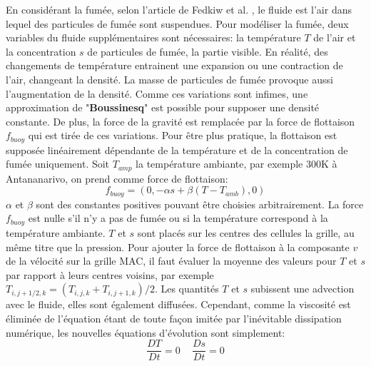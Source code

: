 \documentclass[11pt]{article}
\begin{document}
En considérant la fumée, selon l'article de Fedkiw et al. \cite{fedkiw-stam-jensen-01}, le fluide est l'air dans lequel des particules de fumée sont suspendues. Pour modéliser la fumée, deux variables du fluide supplémentaires sont nécessaires: la température $T$ de l'air et la concentration $s$ de particules de fumée, la partie visible.\newline
En réalité, des changements de température entrainent une expansion ou une contraction de l'air, changeant la densité. La masse de particules de fumée provoque aussi l'augmentation de la densité. Comme ces variations sont infimes, une approximation de "\textbf{Boussinesq}" est possible pour supposer une densité constante. De plus, la force de la gravité est remplacée par la force de flottaison \textit{$f_{buoy}$} qui est tirée de ces variations. Pour être plus pratique, la flottaison est supposée linéairement dépendante de la température et de la concentration de fumée uniquement. Soit $T_{amp}$ la température ambiante, par exemple 300K à Antananarivo, on prend comme force de flottaison:
\begin{equation}
f_{buoy} = (0, -\alpha s + \beta (T-T_{amb}) ,0)
\end{equation}
$\alpha$ et $\beta$ sont des constantes positives pouvant être choisies arbitrairement. La force $f_{buoy}$ est nulle s'il n'y a pas de fumée ou si la température correspond à la température ambiante.
$T$ et $s$ sont placés sur les centres des cellules la grille, au même titre que la pression. Pour ajouter la force de flottaison à la composante $v$ de la vélocité sur la grille MAC, il faut évaluer la moyenne des valeurs pour $T$ et $s$ par rapport à leurs centres voisins, par exemple $T_{i, j+1/2, k} = (T_{i,j,k} + T_{i,j+1,k})/2$.\newline
Les quantités $T$ et $s$ subissent une advection avec le fluide, elles sont également diffusées. Cependant, comme la viscosité est éliminée de l'équation étant de toute façon imitée par l'inévitable dissipation numérique, les nouvelles équations d'évolution sont simplement:
\begin{equation}
\frac{DT}{Dt} = 0 \,\,\,\,\,\,\, \frac{Ds}{Dt} = 0
\end{equation}
\end{document}
